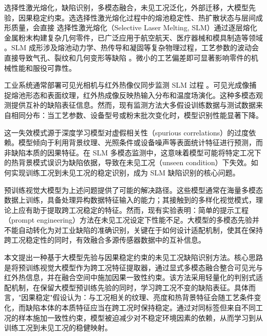 \documentclass[lettersize,journal]{IEEEtran}
\begin{document}
\begin{IEEEkeywords}
选择性激光熔化，缺陷识别，多模态融合，未见工况泛化，外部迁移，大模型先验，因果稳定约束。选选择性激光熔化过程中的熔池稳定性、热扩散状态与层间成形质量，会直接
选择性激光熔化（Selective Laser Melting, SLM）通过逐层熔化金属粉末构建复杂几何零件，已广泛应用于航空航天、医疗器械和模具制造等领域 \cite{ref_defect_formation_slm}。SLM 成形涉及熔池动力学、热传导和凝固等复杂物理过程，工艺参数的波动会直接导致气孔、裂纹和几何变形等缺陷 \cite{ref_in_situ_monitoring_review}。微小的工艺偏差即可显著影响零件的机械性能和服役可靠性。

工业系统通常部署可见光相机与红外热像仪同步监测 SLM 过程 \cite{ref_lpbf_sensing_review,ref_intelligent_defect_pbf}。可见光成像捕捉熔池形态和表面纹理，红外热成像反映热输入分布和温度场演化。这种多模态观测提供互补的缺陷表征信息。然而，现有监测方法大多假设训练数据与测试数据来自相同分布：当工艺参数、设备型号或粉末批次变化时，模型识别性能显著下降。

这一失效模式源于深度学习模型对虚假相关性（spurious correlations）的过度依赖。模型倾向于利用背景纹理、光照条件或设备噪声等表面统计特征进行预测，而非缺陷本质的因果特征。在 SLM 多模态监测中，这意味着模型可能将特定工况下的热背景模式误识为缺陷依据，导致在未见工况（unseen condition）下失效。如何实现训练工况到未见工况的稳定识别，成为 SLM 缺陷识别的核心问题。

预训练视觉大模型为上述问题提供了可能的解决路径。这些模型通常在海量多模态数据上训练，具备处理异构数据特征输入的能力；其接触到的多样化视觉模式，理论上应有助于提取跨工况稳定的特征。然而，现有实验表明：简单的提示工程（prompt engineering）方法在未见工况设定下性能不足。大模型的多模态先验并不能自动转化为对工业缺陷的准确识别，关键在于如何设计适配机制，使其在保持跨工况稳定性的同时，有效融合多源传感器数据中的互补信息。

本文提出一种基于大模型先验与因果稳定约束的未见工况缺陷识别方法。核心思路是将预训练视觉大模型作为跨工况特征提取器，通过显式多模态融合整合可见光与红外热信息，并在融合空间中施加因果一致性约束。该方法采用轻量化的判别式适配机制，在保留大模型预训练先验的同时，学习跨工况不变的缺陷表征。具体而言，"因果稳定"假设认为：与工况相关的纹理、亮度和热背景特征会随工艺条件变化，而缺陷本体的本质特征应当在跨工况时保持稳定。通过对同标签但来自不同工况的样本施加一致性约束，模型被迫减少对不稳定环境因素的依赖，从而学习到从训练工况到未见工况的稳健映射。


\end{IEEEkeywords}
\end{document}
